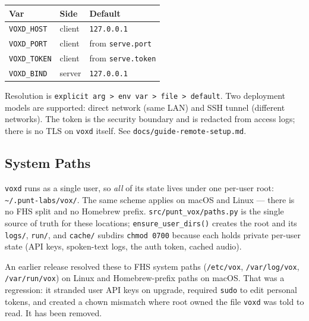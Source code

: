 \documentclass[a4paper,10pt]{article}
\newcommand{\modpath}[1]{\texttt{src/punt\_vox/#1}}
\begin{document}
\begin{center}
\begin{tabular}{lll}
\toprule
\textbf{Var} & \textbf{Side} & \textbf{Default} \\
\midrule
\texttt{VOXD\_HOST}  & client & \texttt{127.0.0.1} \\
\texttt{VOXD\_PORT}  & client & from \texttt{serve.port} \\
\texttt{VOXD\_TOKEN} & client & from \texttt{serve.token} \\
\texttt{VOXD\_BIND}  & server & \texttt{127.0.0.1} \\
\bottomrule
\end{tabular}
\end{center}

Resolution is \texttt{explicit arg > env var > file > default}.  Two
deployment models are supported: direct network (same LAN) and SSH
tunnel (different networks).  The token is the security boundary and is
redacted from access logs; there is no TLS on \texttt{voxd} itself.  See
\texttt{docs/guide-remote-setup.md}.

\subsection{System Paths}

\texttt{voxd} runs as a single user, so \emph{all} of its state lives
under one per-user root: \texttt{\~{}/.punt-labs/vox/}.  The same scheme
applies on macOS and Linux --- there is no FHS split and no Homebrew
prefix.  \modpath{paths.py} is the single source of truth for these
locations; \texttt{ensure\_user\_dirs()} creates the root and its
\texttt{logs/}, \texttt{run/}, and \texttt{cache/} subdirs \texttt{chmod
0700} because each holds private per-user state (API keys, spoken-text
logs, the auth token, cached audio).

An earlier release resolved these to FHS system paths
(\texttt{/etc/vox}, \texttt{/var/log/vox}, \texttt{/var/run/vox}) on
Linux and Homebrew-prefix paths on macOS.  That was a regression: it
stranded user API keys on upgrade, required \texttt{sudo} to edit
personal tokens, and created a chown mismatch where root owned the file
\texttt{voxd} was told to read.  It has been removed.
\end{document}
